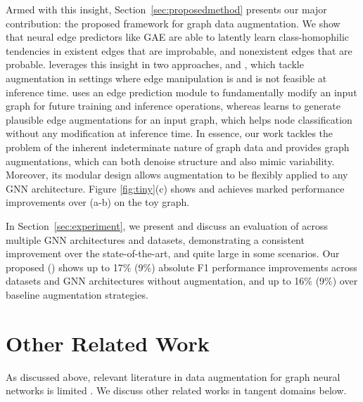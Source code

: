 \documentclass[letterpaper]{article} \usepackage{aaai21}  \usepackage{times}  \usepackage{helvet} \usepackage{courier}  \usepackage[hyphens]{url}  \usepackage{graphicx} \urlstyle{rm} \def\UrlFont{\rm}  \usepackage{natbib}  \usepackage{caption} \frenchspacing  \setlength{\pdfpagewidth}{8.5in}  \setlength{\pdfpageheight}{11in}
\begin{document}
Armed with this insight, Section~\ref{sec:proposedmethod} presents our major contribution: the proposed \methodshared framework for graph data augmentation. We show that neural edge predictors like GAE \cite{kipf2016variational} are able to latently learn class-homophilic tendencies in existent edges that are improbable, and nonexistent edges that are probable.  \methodshared leverages this insight in two approaches, \methodtwo and \method, which tackle augmentation in settings where edge manipulation is and is not feasible at inference time.  \methodtwo uses an edge prediction module to fundamentally modify an input graph for future training and inference operations, whereas \method learns to generate plausible edge augmentations for an input graph, which helps node classification 
without any modification at inference time.  In essence, our work tackles the problem of the inherent indeterminate nature of graph data and provides graph augmentations, which can both denoise structure and also mimic variability.  Moreover, its modular design allows augmentation to be flexibly applied to any GNN architecture.  Figure \ref{fig:tiny}(c) shows \methodtwo and \method achieves marked performance improvements over (a-b) on the toy graph.

In Section~\ref{sec:experiment}, we present and discuss an evaluation of \method across multiple GNN architectures and datasets, demonstrating a consistent improvement over the state-of-the-art, and quite large in some scenarios. Our proposed \methodtwo (\method) shows up to 17\% (9\%) absolute F1 performance improvements across datasets and GNN architectures without augmentation, and up to 16\% (9\%) over baseline augmentation strategies. 





 
\section{Other Related Work}
\label{sec:relatedwork}
As discussed above, relevant literature in data augmentation for graph neural networks is limited \cite{rong2019dropedge, chen2019measuring,zhang2019bayesian}. We discuss other related works in tangent domains below.
\end{document}
